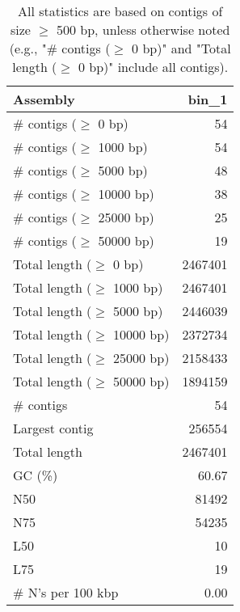 \documentclass[12pt,a4paper]{article}
\begin{document}
\begin{table}[ht]
\begin{center}
\caption{All statistics are based on contigs of size $\geq$ 500 bp, unless otherwise noted (e.g., "\# contigs ($\geq$ 0 bp)" and "Total length ($\geq$ 0 bp)" include all contigs).}
\begin{tabular}{|l*{1}{|r}|}
\hline
Assembly & bin\_1 \\ \hline
\# contigs ($\geq$ 0 bp) & 54 \\ \hline
\# contigs ($\geq$ 1000 bp) & 54 \\ \hline
\# contigs ($\geq$ 5000 bp) & 48 \\ \hline
\# contigs ($\geq$ 10000 bp) & 38 \\ \hline
\# contigs ($\geq$ 25000 bp) & 25 \\ \hline
\# contigs ($\geq$ 50000 bp) & 19 \\ \hline
Total length ($\geq$ 0 bp) & 2467401 \\ \hline
Total length ($\geq$ 1000 bp) & 2467401 \\ \hline
Total length ($\geq$ 5000 bp) & 2446039 \\ \hline
Total length ($\geq$ 10000 bp) & 2372734 \\ \hline
Total length ($\geq$ 25000 bp) & 2158433 \\ \hline
Total length ($\geq$ 50000 bp) & 1894159 \\ \hline
\# contigs & 54 \\ \hline
Largest contig & 256554 \\ \hline
Total length & 2467401 \\ \hline
GC (\%) & 60.67 \\ \hline
N50 & 81492 \\ \hline
N75 & 54235 \\ \hline
L50 & 10 \\ \hline
L75 & 19 \\ \hline
\# N's per 100 kbp & 0.00 \\ \hline
\end{tabular}
\end{center}
\end{table}
\end{document}

